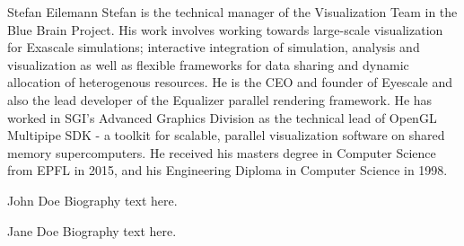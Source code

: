 \documentclass[10pt,journal,compsoc]{IEEEtran}
\begin{document}
\begin{IEEEbiography}{Stefan Eilemann}
Stefan is the technical manager of the Visualization Team in the Blue Brain
Project. His work involves working towards large-scale visualization for
Exascale simulations; interactive integration of simulation, analysis and
visualization as well as flexible frameworks for data sharing and dynamic
allocation of heterogenous resources. He is the CEO and founder of Eyescale and
also the lead developer of the Equalizer parallel rendering framework. He has
worked in SGI's Advanced Graphics Division as the technical lead of OpenGL
Multipipe SDK - a toolkit for scalable, parallel visualization software on
shared memory supercomputers. He received his masters degree in Computer Science
from EPFL in 2015, and his Engineering Diploma in Computer Science in 1998.
\end{IEEEbiography}

\begin{IEEEbiographynophoto}{John Doe}
Biography text here.
\end{IEEEbiographynophoto}


\begin{IEEEbiographynophoto}{Jane Doe}
Biography text here.
\end{IEEEbiographynophoto}




\end{document}
